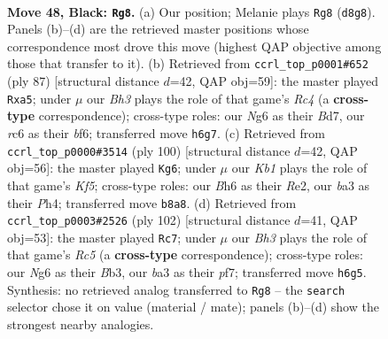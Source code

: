 \documentclass[11pt]{article}
\begin{document}
\clearpage

\begin{figure}[p]\centering
\begin{subfigure}{0.46\textwidth}\centering
\resizebox{\linewidth}{!}{%
\newchessgame
\chessboard[
  setfen={1k1r4/p7/PpR3nb/1B3p2/5P2/B3pK2/8/8 b - - 1 48},
  showmover=false,
  pgfstyle=straightmove, color=movearrow, markmove={d8-g8}
]}
\caption{}
\end{subfigure}\hfill
\begin{subfigure}{0.46\textwidth}\centering
\resizebox{\linewidth}{!}{%
\newchessgame
\chessboard[
  setfen={4k3/1p1b1p2/p4BpK/P1r5/3R1P1p/7P/1P6/8 b - - 3 44},
  showmover=false,
  pgfstyle=straightmove, color=movearrow, markmove={c5-a5}
]}
\caption{}
\end{subfigure}
\\[4pt]
\begin{subfigure}{0.46\textwidth}\centering
\resizebox{\linewidth}{!}{%
\newchessgame
\chessboard[
  setfen={7r/4p2P/2k5/2P2KN1/1p2p2P/2b5/4R3/8 w - - 0 51},
  showmover=false,
  pgfstyle=straightmove, color=movearrow, markmove={f5-g6}
]}
\caption{}
\end{subfigure}\hfill
\begin{subfigure}{0.46\textwidth}\centering
\resizebox{\linewidth}{!}{%
\newchessgame
\chessboard[
  setfen={1r6/5p1k/4pb1P/2R3p1/P5P1/1B6/KP6/8 w - - 1 52},
  showmover=false,
  pgfstyle=straightmove, color=movearrow, markmove={c5-c7}
]}
\caption{}
\end{subfigure}
\caption{\textbf{Move 48, Black: \texttt{Rg8}.} (a) Our position; Melanie plays \texttt{Rg8} (\texttt{d8g8}). Panels (b)--(d) are the retrieved master positions whose correspondence most drove this move (highest QAP objective among those that transfer to it). (b) Retrieved from \texttt{ccrl\_top\_p0001\#652} (ply 87) [structural distance $d$=42, QAP obj=59]: the master played \texttt{Rxa5}; under $\mu$ our \emph{Bh3} plays the role of that game's \emph{Rc4} (a \textbf{cross-type} correspondence); cross-type roles: our \emph{N}g6 as their \emph{B}d7, our \emph{r}c6 as their \emph{b}f6; transferred move \texttt{h6g7}. (c) Retrieved from \texttt{ccrl\_top\_p0000\#3514} (ply 100) [structural distance $d$=42, QAP obj=56]: the master played \texttt{Kg6}; under $\mu$ our \emph{Kb1} plays the role of that game's \emph{Kf5}; cross-type roles: our \emph{B}h6 as their \emph{R}e2, our \emph{b}a3 as their \emph{P}h4; transferred move \texttt{b8a8}. (d) Retrieved from \texttt{ccrl\_top\_p0003\#2526} (ply 102) [structural distance $d$=41, QAP obj=53]: the master played \texttt{Rc7}; under $\mu$ our \emph{Bh3} plays the role of that game's \emph{Rc5} (a \textbf{cross-type} correspondence); cross-type roles: our \emph{N}g6 as their \emph{B}b3, our \emph{b}a3 as their \emph{p}f7; transferred move \texttt{h6g5}. Synthesis: no retrieved analog transferred to \texttt{Rg8} -- the \texttt{search} selector chose it on value (material / mate); panels (b)--(d) show the strongest nearby analogies.}
\label{fig:thought-m95}
\end{figure}
\end{document}
